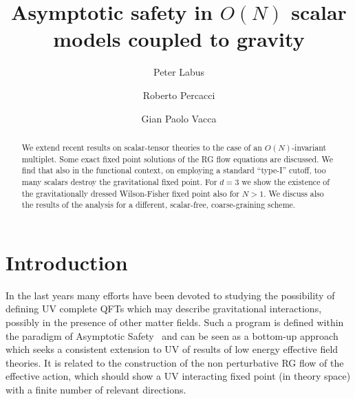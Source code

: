 \documentclass[a4paper,11pt]{revtex4}
\begin{document}
\begin{titlepage}


\title{Asymptotic safety in $O(N)$ scalar models coupled to gravity}

\author{Peter Labus}
\author{Roberto Percacci}
\author{Gian Paolo Vacca}
\pacs{}


\begin{abstract}
We extend recent results on scalar-tensor theories
to the case of an $O(N)$-invariant multiplet.
Some exact fixed point solutions of the RG flow equations are discussed.
We find that also in the functional context, on employing a 
standard ``type-I'' cutoff, 
too many scalars destroy the gravitational fixed point.
For $d=3$ we show the existence of the gravitationally dressed 
Wilson-Fisher fixed point also for $N>1$.
We discuss also the results of the analysis for a different, scalar-free, coarse-graining scheme.
 
\end{abstract} 

\maketitle


\end{titlepage}
\newpage
\setcounter{page}{2}

\section{Introduction}
In the last years many efforts have been devoted to studying the possibility of defining UV complete QFTs
which may describe gravitational interactions, 
possibly in the presence of other matter fields.
Such a program is defined within the paradigm of Asymptotic Safety~\cite{W1} and can be seen as a bottom-up approach which seeks a consistent extension
to UV of results of low energy effective field theories.
It is related to the construction of the non perturbative RG flow of the effective action, which should show a UV interacting fixed point (in theory space) with a finite number of relevant directions.
\end{document}

